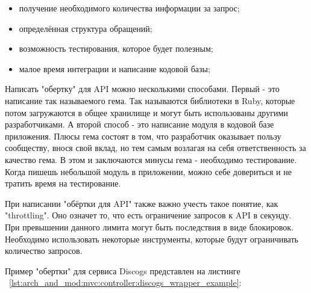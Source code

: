 \begin{itemize}
  \item получение необходимого количества информации за запрос;
  \item определённая структура обращений;
  \item возможность тестирования, которое будет полезным;
  \item малое время интеграции и написание кодовой базы;
\end{itemize}

Написать "обертку" для API можно несколькими способами. Первый - это написание так называемого гема. Так называются библиотеки в Ruby, которые потом загружаются в общее хранилище и могут быть использованы другими разработчиками. А второй способ - это написание модуля в кодовой базе приложения. Плюсы гема состоят в том, что разработчик оказывает пользу сообществу, внося свой вклад, но тем самым возлагая на себя ответственность за качество гема. В этом и заключаются минусы гема - необходимо тестирование. Когда пишешь небольшой модуль в приложении, можно себе довериться и не тратить время на тестирование.

При написании "обёртки для API" также важно учесть такое понятие, как "throttling". Оно означет то, что есть ограничение запросов к API в секунду. При превышении данного лимита могут быть последствия в виде блокировок. Необходимо использовать некоторые инструменты, которые будут ограничивать количество запросов.

Пример "обертки" для сервиса Discogs представлен на листинге ~\ref{lst:arch_and_mod:mvc:controller:discogs_wrapper_example}:



